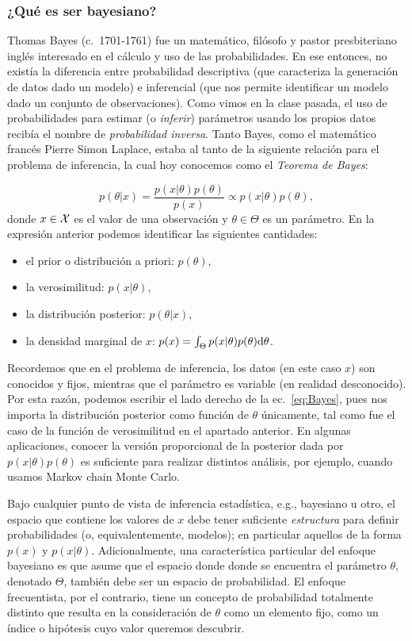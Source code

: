\subsubsection{¿Qué es ser bayesiano?}
\label{ssub:que_es_bayes}

Thomas Bayes (c.~1701-1761) fue un matemático, filósofo y pastor presbiteriano inglés interesado en el cálculo y uso de las probabilidades. En ese entonces, no existía la diferencia entre probabilidad descriptiva (que caracteriza la generación de datos dado un modelo) e inferencial (que nos permite identificar un modelo dado un conjunto de observaciones). Como vimos en la clase pasada, el uso de probabilidades para estimar (o \emph{inferir}) parámetros usando los propios datos recibía el nombre de \emph{probabilidad inversa}. Tanto Bayes, como el matemático francés Pierre Simon Laplace, estaba al tanto de la siguiente relación para el problema de inferencia, la cual hoy conocemos como el \emph{Teorema de Bayes}:

\begin{equation}
	p(\theta|x) = \frac{p(x|\theta)p(\theta)}{p(x)} \propto p(x|\theta)p(\theta),\label{eq:Bayes}
\end{equation}
donde $x\in{\mathcal X}$ es el valor de una observación y $\theta\in\Theta$ es un parámetro. En la expresión anterior podemos identificar las siguientes cantidades:
\begin{itemize}
	\item el prior o distribución a priori: $p(\theta)$,
	\item la verosimilitud: $p(x|\theta)$,
	\item la distribución posterior: $p(\theta|x)$,
	\item la densidad marginal de $x$: $p(x) = \int_\Theta p(x|\theta)p(\theta){\text d}\theta$.
\end{itemize}
Recordemos que en el problema de inferencia, los datos (en este caso $x$) son conocidos y fijos, mientras que el parámetro es variable (en realidad desconocido). Por esta razón, podemos escribir el lado derecho de la ec.~\eqref{eq:Bayes}, pues nos importa la distribución posterior como función de $\theta$ únicamente, tal como fue el caso de la función de verosimilitud en el apartado anterior. En algunas aplicaciones, conocer la versión proporcional de la posterior dada por $p(x|\theta)p(\theta)$ es suficiente para realizar distintos análisis, por ejemplo, cuando usamos Markov chain Monte Carlo.

Bajo cualquier punto de vista de inferencia estadística, e.g., bayesiano u otro, el espacio que contiene los valores de $x$ debe tener suficiente \emph{estructura} para definir probabilidades (o, equivalentemente, modelos); en particular aquellos de la forma $p(x)$ y $p(x|\theta)$. Adicionalmente, una característica particular del enfoque bayesiano es que asume que el espacio donde donde se encuentra el parámetro $\theta$, denotado $\Theta$, también debe ser un espacio de probabilidad. El enfoque frecuentista, por el contrario, tiene un concepto de probabilidad totalmente distinto que resulta en la consideración de $\theta$ como un elemento fijo, como un índice o hipótesis cuyo valor queremos descubrir.


